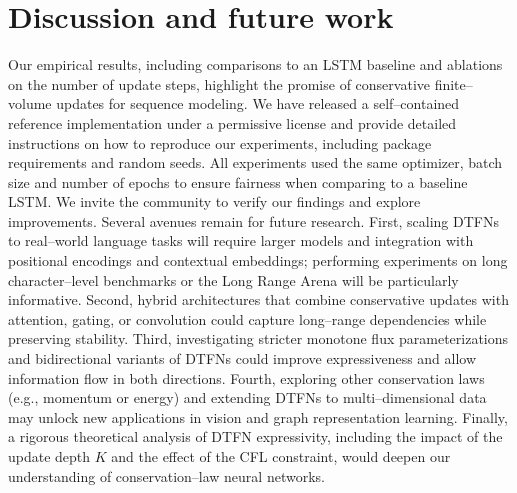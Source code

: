 \documentclass[10pt]{article}
\begin{document}
\section{Discussion and future work}
Our empirical results, including comparisons to an LSTM baseline and
ablations on the number of update steps, highlight the promise of
conservative finite--volume updates for sequence modeling.  We have
released a self--contained reference implementation under a permissive
license and provide detailed instructions on how to reproduce our
experiments, including package requirements and random seeds.  All
experiments used the same optimizer, batch size and number of epochs to
ensure fairness when comparing to a baseline LSTM.  We invite the
community to verify our findings and explore improvements.  Several
avenues remain for future research.  First, scaling DTFNs to real--world
language tasks will require larger models and integration with positional
encodings and contextual embeddings; performing experiments on long
character--level benchmarks or the Long Range Arena will be
particularly informative.  Second, hybrid architectures that combine
conservative updates with attention, gating, or convolution could
capture long--range dependencies while preserving stability.  Third,
investigating stricter monotone flux parameterizations and bidirectional
variants of DTFNs could improve expressiveness and allow information
flow in both directions.  Fourth, exploring other conservation laws
(e.g., momentum or energy) and extending DTFNs to multi--dimensional
data may unlock new applications in vision and graph representation
learning.  Finally, a rigorous theoretical analysis of DTFN
expressivity, including the impact of the update depth $K$ and the
effect of the CFL constraint, would deepen our understanding of
conservation--law neural networks.
\end{document}
